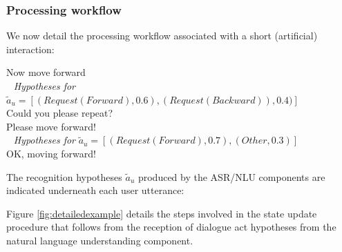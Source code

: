\subsubsection*{Processing workflow}

We now detail the processing workflow associated with a short (artificial) interaction:

\begin{dialogue} 
 Now move forward \\ $\phantom{b}$ \textit{Hypotheses for} $\tilde{a}_u = [ (\mathit{Request(Forward)}, 0.6), (\mathit{Request(Backward)}), 0.4)]$  \\[-3mm]
 Could you please repeat? \\[-3mm]
 Please move forward! \\ $\phantom{b}$ \textit{Hypotheses for} $\tilde{a}_u = [ (\mathit{Request(Forward)}, 0.7), (\mathit{Other}, 0.3) ]$ \\[-3mm]
 OK, moving forward!
\end{dialogue}

The recognition hypotheses $\tilde{a}_u$ produced by the ASR/NLU components are indicated underneath each user utterance:

Figure \ref{fig:detailedexample} details the steps involved in the state update procedure that follows from the reception of dialogue act hypotheses from the natural language understanding component. 


